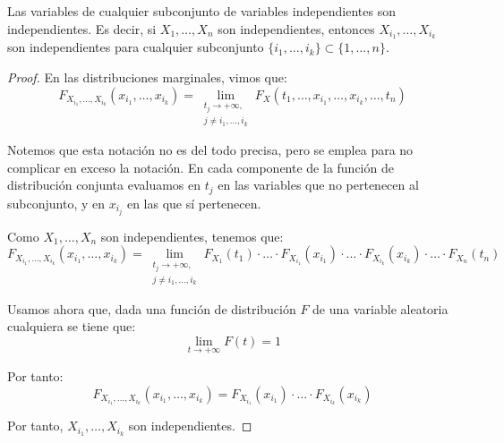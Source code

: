 \begin{prop}
    Las variables de cualquier subconjunto de variables independientes son independientes. Es decir, si $X_1, \ldots, X_n$ son independientes, entonces $X_{i_1}, \ldots, X_{i_k}$ son independientes para cualquier subconjunto $\{i_1, \ldots, i_k\}\subset \{1, \ldots, n\}$.
\end{prop}
\begin{proof}
    En las distribuciones marginales, vimos que:
    \begin{equation*}
        F_{X_{i_1},\dots,X_{i_k}}(x_{i_1},\dots,x_{i_k}) = \lim_{\substack{t_j\to +\infty,\\j\neq i_1,\dots,i_k}} F_X(t_1, \ldots, x_{i_1}, \ldots, x_{i_k}, \ldots, t_n)
    \end{equation*}
    \begin{observacion}
        Notemos que esta notación no es del todo precisa, pero se emplea para no complicar en exceso la notación. En cada componente de la función de distribución conjunta evaluamos en $t_j$ en las variables que no pertenecen al subconjunto, y en $x_{i_j}$ en las que sí pertenecen.
    \end{observacion}

    Como $X_1, \ldots, X_n$ son independientes, tenemos que:
    \begin{equation*}
        F_{X_{i_1},\dots,X_{i_k}}(x_{i_1},\dots,x_{i_k}) = \lim_{\substack{t_j\to +\infty,\\j\neq i_1,\dots,i_k}} F_{X_1}(t_1) \cdot \ldots \cdot F_{X_{i_1}}(x_{i_1}) \cdot \ldots \cdot F_{X_{i_k}}(x_{i_k}) \cdot \ldots \cdot F_{X_n}(t_n)
    \end{equation*}

    Usamos ahora que, dada una función de distribución $F$ de una variable aleatoria cualquiera se tiene que:
    \begin{equation*}
        \lim_{t\to +\infty} F(t) = 1
    \end{equation*}

    Por tanto:
    \begin{equation*}
        F_{X_{i_1},\dots,X_{i_k}}(x_{i_1},\dots,x_{i_k}) = F_{X_{i_1}}(x_{i_1}) \cdot \ldots \cdot F_{X_{i_k}}(x_{i_k})
    \end{equation*}

    Por tanto, $X_{i_1}, \ldots, X_{i_k}$ son independientes.
\end{proof}


